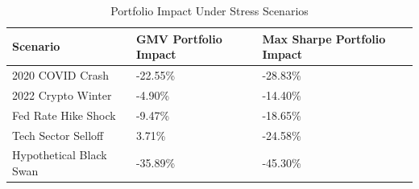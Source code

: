 \begin{table}[H]
\centering
\caption{\label{tab:stress_summary}Portfolio Impact Under Stress Scenarios}
\centering
\fontsize{9}{11}\selectfont
\begin{tabular}[t]{lll}
\toprule
Scenario & GMV Portfolio Impact & Max Sharpe Portfolio Impact\\
\midrule
2020 COVID Crash & -22.55\% & -28.83\%\\
2022 Crypto Winter & -4.90\% & -14.40\%\\
Fed Rate Hike Shock & -9.47\% & -18.65\%\\
Tech Sector Selloff & 3.71\% & -24.58\%\\
Hypothetical Black Swan & -35.89\% & -45.30\%\\
\bottomrule
\end{tabular}
\end{table}
